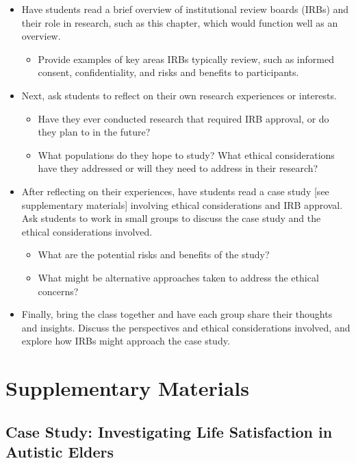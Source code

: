 \documentclass[
  11pt,
]{book}
\providecommand{\tightlist}{%
  \setlength{\itemsep}{0pt}\setlength{\parskip}{0pt}}
\begin{document}
\begin{itemize}
\tightlist
\item
  Have students read a brief overview of institutional review boards (IRBs) and their role in research, such as this chapter, which would function well as an overview.

  \begin{itemize}
  \tightlist
  \item
    Provide examples of key areas IRBs typically review, such as informed consent, confidentiality, and risks and benefits to participants.
  \end{itemize}
\item
  Next, ask students to reflect on their own research experiences or interests.

  \begin{itemize}
  \tightlist
  \item
    Have they ever conducted research that required IRB approval, or do they plan to in the future?
  \item
    What populations do they hope to study? What ethical considerations have they addressed or will they need to address in their research?
  \end{itemize}
\item
  After reflecting on their experiences, have students read a case study {[}see supplementary materials{]} involving ethical considerations and IRB approval. Ask students to work in small groups to discuss the case study and the ethical considerations involved.

  \begin{itemize}
  \tightlist
  \item
    What are the potential risks and benefits of the study?
  \item
    What might be alternative approaches taken to address the ethical concerns?
  \end{itemize}
\item
  Finally, bring the class together and have each group share their thoughts and insights. Discuss the perspectives and ethical considerations involved, and explore how IRBs might approach the case study.
\end{itemize}

\section{Supplementary Materials}\label{supplementary-materials}

\subsection{Case Study: Investigating Life Satisfaction in Autistic Elders}\label{case-study-investigating-life-satisfaction-in-autistic-elders}
\end{document}
